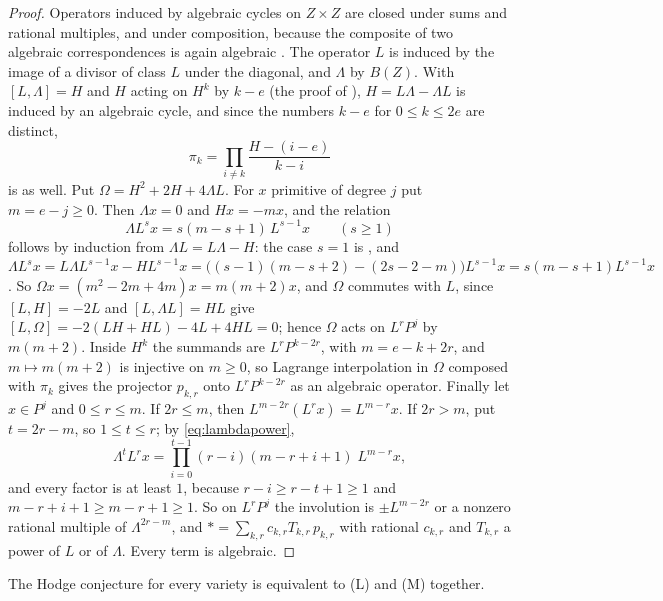 \begin{proof}
Operators induced by algebraic cycles on $Z\times Z$ are closed under sums
and rational multiples, and under composition, because the composite of two
algebraic correspondences is again algebraic \cite{Kle68}. The operator $L$
is induced by the image of a divisor of class $L$ under the diagonal, and $\Lambda$ by $B(Z)$. With
$[L,\Lambda]=H$ and $H$ acting on $H^{k}$ by $k-e$ (the proof of
), $H=L\Lambda-\Lambda L$ is induced by an algebraic cycle,
and since the numbers $k-e$ for $0\le k\le 2e$ are distinct,
\[
  \pi_{k}=\prod_{i\ne k}\frac{H-(i-e)}{k-i}
\]
is as well. Put $\Omega=H^{2}+2H+4\Lambda L$. For $x$ primitive of degree
$j$ put $m=e-j\ge0$. Then $\Lambda x=0$ and $Hx=-mx$, and the relation
\begin{equation}\label{eq:lambdapower}
  \Lambda L^{s}x=s(m-s+1)\,L^{s-1}x\qquad(s\ge1)
\end{equation}
follows by induction from $\Lambda L=L\Lambda-H$: the case $s=1$ is
, and
$\Lambda L^{s}x=L\Lambda L^{s-1}x-HL^{s-1}x
=\bigl((s-1)(m-s+2)-(2s-2-m)\bigr)L^{s-1}x=s(m-s+1)L^{s-1}x$.
So $\Omega x=(m^{2}-2m+4m)x=m(m+2)x$, and $\Omega$ commutes with $L$, since
$[L,H]=-2L$ and $[L,\Lambda L]=HL$ give $[L,\Omega]=-2(LH+HL)-4L+4HL=0$;
hence $\Omega$ acts on $L^{r}P^{j}$ by $m(m+2)$. Inside $H^{k}$ the summands
are $L^{r}P^{k-2r}$, with $m=e-k+2r$, and $m\mapsto m(m+2)$ is injective on
$m\ge0$, so Lagrange interpolation in $\Omega$ composed with $\pi_{k}$ gives
the projector $p_{k,r}$ onto $L^{r}P^{k-2r}$ as an algebraic operator.
Finally let $x\in P^{j}$ and $0\le r\le m$. If $2r\le m$, then
$L^{m-2r}(L^{r}x)=L^{m-r}x$. If $2r>m$, put $t=2r-m$, so $1\le t\le r$;
by \eqref{eq:lambdapower},
\[
  \Lambda^{t}L^{r}x=\prod_{i=0}^{t-1}(r-i)(m-r+i+1)\;L^{m-r}x,
\]
and every factor is at least $1$, because $r-i\ge r-t+1\ge1$ and
$m-r+i+1\ge m-r+1\ge1$. So on $L^{r}P^{j}$ the involution is $\pm L^{m-2r}$
or a nonzero rational multiple of $\Lambda^{2r-m}$, and
${*}=\sum_{k,r}c_{k,r}T_{k,r}\,p_{k,r}$ with rational $c_{k,r}$ and
$T_{k,r}$ a power of $L$ or of $\Lambda$. Every term is algebraic.
\end{proof}

\begin{proposition}\label{prop:lefmot}
The Hodge conjecture for every variety is equivalent to \textup{(L)} and
\textup{(M)} together.
\end{proposition}

